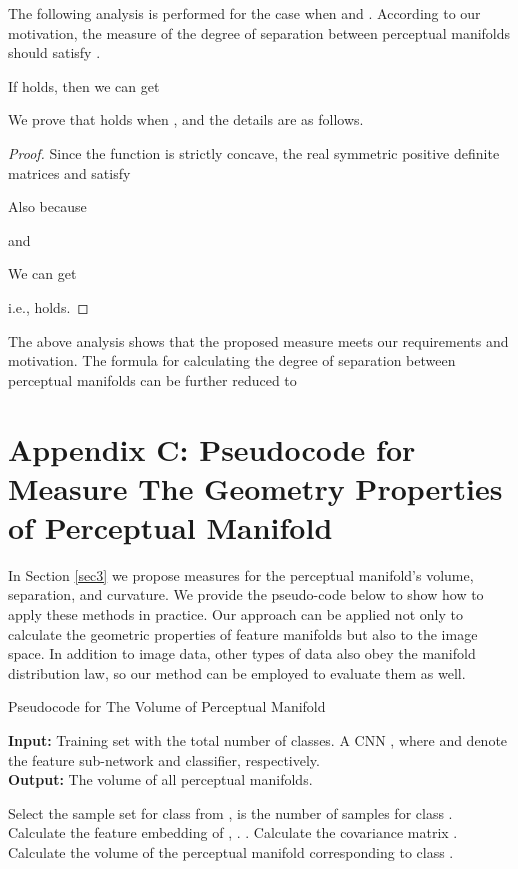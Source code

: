 \documentclass[10pt,twocolumn,letterpaper]{article}
\newtheorem*{proof}{Proof}
\begin{document}
The following analysis is performed for the case when  and . According to our motivation, the measure of the degree of separation between perceptual manifolds should satisfy . 

If  holds, then we can get 
\begin{small}

\end{small}
We prove that  holds when , and the details are as follows. 

\begin{proof}
Since the function  is strictly concave, the real symmetric positive definite matrices  and  satisfy \cite{paper57}
\begin{small}

\end{small}
Also because

and

We can get 

i.e.,  holds.
\end{proof}

The above analysis shows that the proposed measure meets our requirements and motivation. The formula for calculating the degree of separation between perceptual manifolds can be further reduced to 




\section*{Appendix C: Pseudocode for Measure The Geometry Properties of Perceptual Manifold}
\label{secC}

In Section \ref{sec3} we propose measures for the perceptual manifold's volume, separation, and curvature. We provide the pseudo-code below to show how to apply these methods in practice. Our approach can be applied not only to calculate the geometric properties of feature manifolds but also to the image space. In addition to image data, other types of data also obey the manifold distribution law, so our method can be employed to evaluate them as well.


\begin{algorithm*}[t]
\caption{Pseudocode for The Volume of Perceptual Manifold}
\label{alg2}
\textbf{Input:} Training set  with the total number  of classes. A CNN , where  and  denote the feature sub-network and classifier, respectively. \\
\textbf{Output:} The volume of all perceptual manifolds.
\begin{algorithmic}[1] 
   \STATE Select the sample set  for class  from ,  is the number of samples for class .
   \STATE Calculate the feature embedding  of , .
   \STATE .
   \STATE Calculate the covariance matrix .
   \STATE Calculate the volume  of the perceptual manifold corresponding to class .
   \ENDFOR
\end{algorithmic}
\end{algorithm*}
\end{document}
